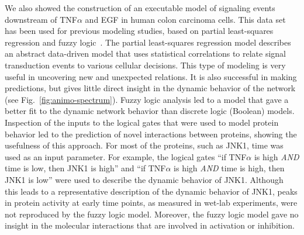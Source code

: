 \documentclass{bmcart}
\begin{document}
We also showed the construction of an executable model
of signaling events downstream of
TNF$\alpha$ and EGF in human colon carcinoma cells. This data set has been used for
previous modeling studies, based on partial least-squares regression and fuzzy
logic~\cite{pathway-leastsquare,pathway-fuzzy}.
The partial least-squares regression model describes an abstract data-driven model
that uses statistical correlations
to relate signal transduction events to various cellular decisions. This type of modeling is
very useful in uncovering new and unexpected relations. It is also successful in making
predictions, but gives little direct insight in the dynamic behavior of the network (see Fig.~\ref{fig:animo-spectrum}). Fuzzy
logic analysis led to a model that gave a better fit to the dynamic network behavior than
discrete logic (Boolean) models. Inspection of the inputs to the logical gates that were used
to model protein behavior led to the prediction of novel interactions between proteins,
showing the usefulness of this approach. For most of the proteins, such as JNK1, time was
used as an input parameter. For example, the logical gates ``if TNF$\alpha$ is high
\emph{AND} time is low, then JNK1 is high'' and ``if TNF$\alpha$ is high \emph{AND} time is
high, then JNK1 is low'' were used to
describe the dynamic behavior of JNK1. Although this leads to a representative
description of the dynamic behavior of JNK1, peaks in protein activity at early time points,
as measured in wet-lab experiments, were
not reproduced by the fuzzy logic model. Moreover, the fuzzy logic model gave no insight in the molecular interactions
that are involved in activation or inhibition.
\end{document}
